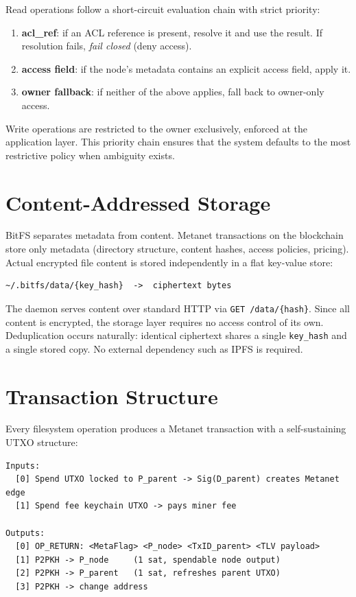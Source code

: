 \documentclass[11pt,a4paper]{article}
\begin{document}
Read operations follow a short-circuit evaluation chain with strict priority:

\begin{enumerate}
\item \textbf{acl\_ref}: if an ACL reference is present, resolve it and use the result. If resolution fails, \emph{fail closed} (deny access).
\item \textbf{access field}: if the node's metadata contains an explicit access field, apply it.
\item \textbf{owner fallback}: if neither of the above applies, fall back to owner-only access.
\end{enumerate}

Write operations are restricted to the owner exclusively, enforced at the application layer. This priority chain ensures that the system defaults to the most restrictive policy when ambiguity exists.

\section{Content-Addressed Storage}

BitFS separates metadata from content. Metanet transactions on the blockchain store only metadata (directory structure, content hashes, access policies, pricing). Actual encrypted file content is stored independently in a flat key-value store:

\begin{lstlisting}
~/.bitfs/data/{key_hash}  ->  ciphertext bytes
\end{lstlisting}

The daemon serves content over standard HTTP via \texttt{GET /data/\{hash\}}. Since all content is encrypted, the storage layer requires no access control of its own. Deduplication occurs naturally: identical ciphertext shares a single \texttt{key\_hash} and a single stored copy. No external dependency such as IPFS is required.

\section{Transaction Structure}
\label{sec:transaction}

Every filesystem operation produces a Metanet transaction with a self-sustaining UTXO structure:

\begin{lstlisting}
Inputs:
  [0] Spend UTXO locked to P_parent -> Sig(D_parent) creates Metanet edge
  [1] Spend fee keychain UTXO -> pays miner fee

Outputs:
  [0] OP_RETURN: <MetaFlag> <P_node> <TxID_parent> <TLV payload>
  [1] P2PKH -> P_node     (1 sat, spendable node output)
  [2] P2PKH -> P_parent   (1 sat, refreshes parent UTXO)
  [3] P2PKH -> change address
\end{lstlisting}
\end{document}
